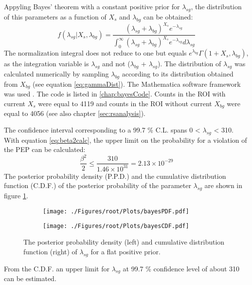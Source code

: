 Appyling Bayes' theorem with a constant positive prior for $\lambda_{sg}$, the distribution of this parameters as a function of $X_{s}$ and $\lambda_{bg}$ can be obtained:
\begin{equation}
 f(\lambda_{sg}|X_{s},\lambda_{bg}) = \frac{(\lambda_{sg}+\lambda_{bg})^{X_{s}}e^{-\lambda_{sg}}}{\int_{0}^{\infty} (\lambda_{sg}+\lambda_{bg})^{X_{s}}e^{-\lambda_{sg}} d\lambda_{sg}}
\end{equation} 
The normalization integral does not reduce to one but equals $e^{\lambda_{bg}}\Gamma(1+X_{s},\lambda_{bg})$, as the integration variable is $\lambda_{sg}$ and not ($\lambda_{bg}$ + $\lambda_{sg}$). The distribution of $\lambda_{sg}$ was calculated numerically by sampling $\lambda_{bg}$ according to its distribution obtained from $X_{bg}$ (see equation \ref{eq:gammaDist}). The Mathematica software framework was used \cite{Research2016}. The code is listed in \ref{chap:bayesCode}. Counts in the ROI with current $X_{s}$ were equal to 4119 and counts in the ROI without current $X_{bg}$ were equal to 4056 (see also chapter \ref{sec:rsanalysis}). 

The confidence interval corresponding to a 99.7 \% C.L. spans 0 < $\lambda_{sg}$ < 310. With equation \ref{eq:beta2calc}, the upper limit on the probability for a violation of the PEP can be calculated:
\begin{equation}
 \frac{\beta^{2}}{2} \leq \frac{310}{1.46 \times 10^{31}} = 2.13 \times 10^{-29}
\end{equation} 
The posterior probability density (P.P.D.) and the cumulative distribution function (C.D.F.) of the posterior probability of the parameter $\lambda_{sg}$ are shown in figure \ref{fig:bayesPdf}.
\begin{figure}[h]
 \centering
 \begin{subfigure}{.49\textwidth}
 \centering
 \texttt{[image: ./Figures/root/Plots/bayesPDF.pdf]}
 \end{subfigure}
 \hfill
 \begin{subfigure}{.49\textwidth}
 \centering
 \texttt{[image: ./Figures/root/Plots/bayesCDF.pdf]}
 \end{subfigure}
 \caption{The posterior probability density (left) and cumulative distribution function (right) of $\lambda_{sg}$ for a flat positive prior.}
 \label{fig:bayesPdf}
\end{figure}
From the C.D.F. an upper limit for $\lambda_{sg}$ at 99.7 \% confidence level of about 310 can be estimated.

